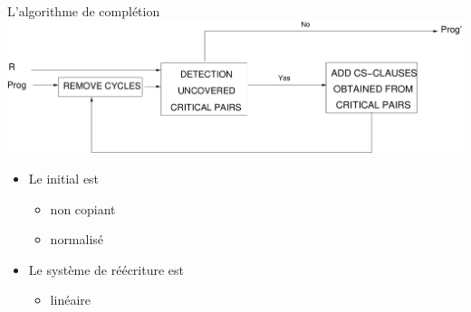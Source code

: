 \begin{frame}{L'algorithme de complétion}
  \includegraphics[width=\linewidth]{media/schema.pdf}\\
  \begin{itemize}[<+->]
  \item Le \csprogramme initial est
    \begin{itemize}
      \item non copiant
      \item normalisé
    \end{itemize}
    \vspace{\baselineskip}
  \item Le système de réécriture est
    \begin{itemize}
      \item linéaire
    \end{itemize}
  \end{itemize}
\end{frame}

